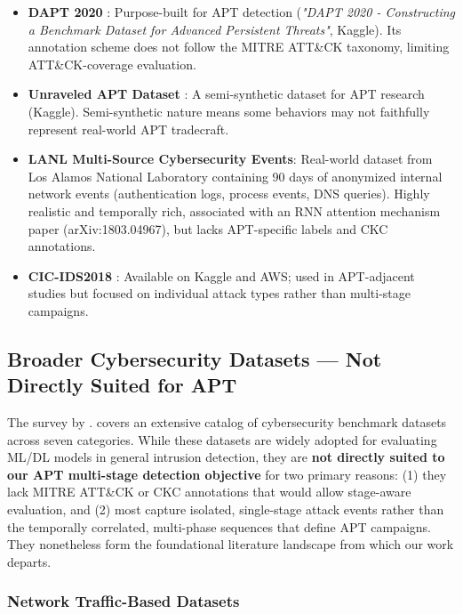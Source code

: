 \begin{itemize}
    \item \textbf{DAPT 2020} \cite{myneni2020dapt}: Purpose-built for APT detection (\textit{"DAPT 2020 - Constructing a Benchmark Dataset for Advanced Persistent Threats"}, Kaggle). Its annotation scheme does not follow the MITRE ATT\&CK taxonomy, limiting ATT\&CK-coverage evaluation.
    \item \textbf{Unraveled APT Dataset} \cite{myneni2023unraveled}: A semi-synthetic dataset for APT research (Kaggle). Semi-synthetic nature means some behaviors may not faithfully represent real-world APT tradecraft.
    \item \textbf{LANL Multi-Source Cybersecurity Events}: Real-world dataset from Los Alamos National Laboratory containing 90 days of anonymized internal network events (authentication logs, process events, DNS queries). Highly realistic and temporally rich, associated with an RNN attention mechanism paper (arXiv:1803.04967), but lacks APT-specific labels and CKC annotations.
    \item \textbf{CIC-IDS2018} \cite{hewapathirana2025comparative}: Available on Kaggle and AWS; used in APT-adjacent studies but focused on individual attack types rather than multi-stage campaigns.
\end{itemize}


\subsection{Broader Cybersecurity Datasets --- Not Directly Suited for APT}

The survey by \cite{ankalaki2025cyber}. covers an extensive catalog of cybersecurity benchmark datasets across seven categories. While these datasets are widely adopted for evaluating ML/DL models in general intrusion detection, they are \textbf{not directly suited to our APT multi-stage detection objective} for two primary reasons: (1) they lack MITRE ATT\&CK or CKC annotations that would allow stage-aware evaluation, and (2) most capture isolated, single-stage attack events rather than the temporally correlated, multi-phase sequences that define APT campaigns. They nonetheless form the foundational literature landscape from which our work departs.

\subsubsection{Network Traffic-Based Datasets}

